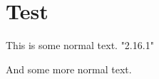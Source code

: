 \documentclass{article}
\newenvironment{lilypondcode}
    {\verbatim}
    {\endverbatim}
\begin{document}
\section{Test}
This is some normal text.
\begin{lilypondcode}
\version "2.16.1"

\header{}
\end{lilypondcode}
And some more normal text.
\end{document}
